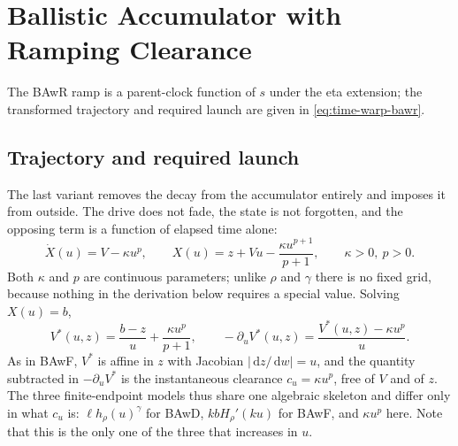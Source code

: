 \documentclass[12pt]{article}
\newcommand{\dd}{\,\mathrm{d}}
\theoremstyle{remark}
\begin{document}
\section{Ballistic Accumulator with Ramping Clearance}
\label{sec:bawr}
The BAwR ramp is a parent-clock function of \(s\) under the eta extension; the transformed trajectory and required launch are given in
\eqref{eq:time-warp-bawr}.
\subsection{Trajectory and required launch}
The last variant removes the decay from the accumulator entirely and imposes it from outside. The drive does not fade, the state is not forgotten, and the opposing term is a function of elapsed time alone:
\begin{equation}
  \dot X(u) = V - \kappa u^{p},
  \qquad
  X(u) = z + Vu - \frac{\kappa u^{p+1}}{p+1},
  \qquad \kappa>0,\ p>0.
  \label{eq:bawr-traj}
\end{equation}
Both $\kappa$ and $p$ are continuous parameters; unlike $\rho$ and $\gamma$ there is no fixed grid, because nothing in the derivation below requires a special value. Solving $X(u)=b$,
\begin{equation}
  V^{*}(u,z) = \frac{b-z}{u} + \frac{\kappa u^{p}}{p+1},
  \qquad
  -\partial_u V^{*}(u,z) = \frac{V^{*}(u,z)-\kappa u^{p}}{u}.
  \label{eq:bawr-vstar}
\end{equation}
As in BAwF, $V^{*}$ is affine in $z$ with Jacobian $|\dd z/\dd w|=u$, and the quantity subtracted in $-\partial_uV^{*}$ is the instantaneous clearance $c_u=\kappa u^{p}$, free of $V$ and of $z$. The three finite-endpoint models thus share one algebraic skeleton and differ only in what $c_u$ is: $\ell h_\rho(u)^\gamma$ for BAwD, $kbH_\rho'(ku)$ for BAwF, and $\kappa u^p$ here. Note that this is the only one of the three that increases in $u$.
\end{document}
